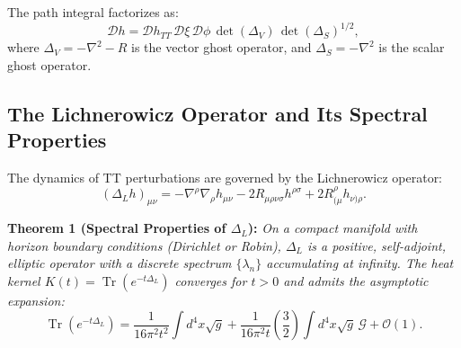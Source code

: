 \documentclass[%
 preprint,
 aps,
 prd,
 amsmath,amssymb,
 floatfix,
 longbibliography,
]{revtex4-2}
\begin{document}
The path integral factorizes as:
\[
\boxed{\mathcal{D}h = \mathcal{D}h_{TT} \, \mathcal{D}\xi \, \mathcal{D}\phi \, \det(\Delta_V) \, \det(\Delta_S)^{1/2},}
\]
where \(\Delta_V = -\nabla^2 - R\) is the vector ghost operator, and \(\Delta_S = -\nabla^2\) is the scalar ghost operator.

\subsection{The Lichnerowicz Operator and Its Spectral Properties}

The dynamics of TT perturbations are governed by the Lichnerowicz operator:
\[
\boxed{(\Delta_L h)_{\mu\nu} = -\nabla^\rho\nabla_\rho h_{\mu\nu} - 2 R_{\mu\rho\nu\sigma} h^{\rho\sigma} + 2 R_{(\mu}^{\rho} h_{\nu)\rho}.}
\]

\textbf{Theorem 1 (Spectral Properties of \(\Delta_L\)):} \textit{On a compact manifold with horizon boundary conditions (Dirichlet or Robin), \(\Delta_L\) is a positive, self-adjoint, elliptic operator with a discrete spectrum \(\{\lambda_n\}\) accumulating at infinity. The heat kernel \(K(t) = \operatorname{Tr}(e^{-t\Delta_L})\) converges for \(t>0\) and admits the asymptotic expansion:
\[
\operatorname{Tr}(e^{-t\Delta_L}) = \frac{1}{16\pi^2 t^2} \int d^4x \sqrt{g} + \frac{1}{16\pi^2 t} \left(\frac{3}{2}\right) \int d^4x \sqrt{g} \, \mathcal{G} + \mathcal{O}(1).
\]}
\end{document}
